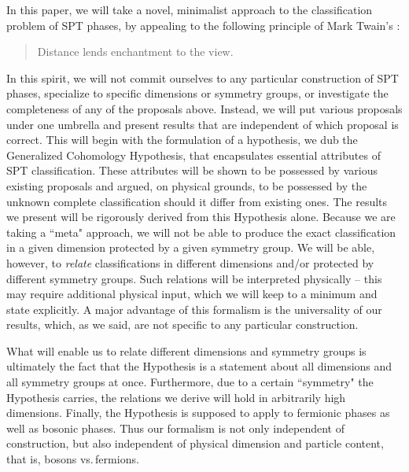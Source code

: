 \documentclass[sort&compress]{elsarticle}
\theoremstyle{theoremstyle}
\theoremstyle{framedtheoremstyle}
\theoremstyle{definitionstyle}
\theoremstyle{definitionstyle}
\theoremstyle{definitionstyle}
\theoremstyle{definitionstyle}
\theoremstyle{nameddefinitionstyle}
\theoremstyle{framednameddefinitionstyle}
\theoremstyle{proofstyle}
\theoremstyle{definitionstyle}
\begin{document}
In this paper, we will take a novel, minimalist approach to the classification problem of SPT phases, by appealing to the following principle of Mark Twain's \cite{MarkTwain}:
\begin{quote}
Distance lends enchantment to the view.
\end{quote}
In this spirit, we will not
commit ourselves to any particular construction of SPT phases,
specialize to specific dimensions or symmetry groups,
or investigate the completeness of any of the proposals above.
Instead, we will put various proposals under one umbrella and present results that are independent of which proposal is correct. This will begin with the formulation of a hypothesis, we dub the Generalized Cohomology Hypothesis, that encapsulates essential attributes of SPT classification. These attributes will be shown to be possessed by various existing proposals and argued, on physical grounds, to be possessed by the unknown complete classification should it differ from existing ones. The results we present will be rigorously derived from this Hypothesis alone. Because we are taking a ``meta" approach, we will not be able to produce the exact classification in a given dimension protected by a given symmetry group. We will be able, however, to \emph{relate} classifications in different dimensions and/or protected by different symmetry groups. Such relations will be interpreted physically -- this may require additional physical input, which we will keep to a minimum and state explicitly. A major advantage of this formalism is the universality of our results, which, as we said, are not specific to any particular construction.

What will enable us to relate different dimensions and symmetry groups is ultimately the fact that the Hypothesis is a statement about all dimensions and all symmetry groups at once. Furthermore, due to a certain ``symmetry" the Hypothesis carries, the relations we derive will hold in arbitrarily high dimensions. Finally, the Hypothesis is supposed to apply to fermionic phases as well as bosonic phases. Thus our formalism is not only independent of construction, but also independent of physical dimension and particle content, that is, bosons vs.\,fermions.
\end{document}
